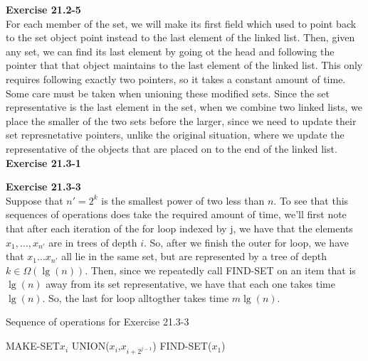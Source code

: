 \documentclass{article}
\begin{document}
\noindent\textbf{Exercise 21.2-5}\\
For each member of the set, we will make its first field which used to point back to the set object point instead to the last element of the linked list. Then, given any set, we can find its last element by going ot the head and following the pointer that that object maintains to the last element of the linked list. This only requires following exactly two pointers, so it takes a constant amount of time. Some care must be taken when unioning these modified sets. Since the set representative is the last element in the set, when we combine two linked lists, we place the smaller of the two sets before the larger, since we need to update their set represnetative pointers, unlike the original situation, where we update the representative of the objects that are placed on to the end of the linked list.\\

\noindent\textbf{Exercise 21.3-1}\\

\noindent\textbf{Exercise 21.3-3}\\
Suppose that $n' =2^k$ is the smallest power of two less than $n$. To see that this sequences of operations does take the required amount of time, we'll first note that after each iteration of the for loop indexed by j, we have that the elements $x_1,\ldots,x_{n'}$ are in trees of depth $i$. So, after we finish the outer for loop, we have that $x_1 \ldots x_{n'}$ all lie in the same set, but are represented by a tree of depth $k\in \Omega(\lg(n))$. Then, since we repeatedly call FIND-SET on an item that is $\lg(n)$ away from its set representative, we have that each one takes time $\lg(n)$. So, the last for loop alltogther takes time $m\lg(n)$.\\
\begin{algorithm}
\caption{Sequence of operations for Exercise 21.3-3}
\begin{algorithmic}
\State MAKE-SET{$x_i$}
\EndFor
{}
\State UNION($x_i$,$x_{i+2^{j-1}}$)
\EndFor
\EndFor
{}
\State FIND-SET($x_1$)
\EndFor
\end{algorithmic}
\end{algorithm}
\end{document}
